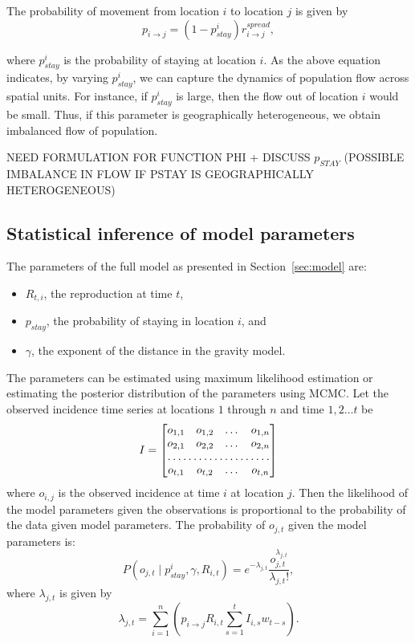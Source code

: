 \documentclass[11pt,]{article}
\begin{document}
The probability of movement from location \(i\) to location \(j\) is given by
\[  p_{i \rightarrow j} = (1 - p_{stay}^i) r_{i \rightarrow j}^{spread},\]

where \(p_{stay}^i\) is the probability of staying at location
\(i\). As the above equation indicates, by varying $p_{stay}^i$, we
can capture the dynamics of population flow across spatial units. For
instance, if \(p_{stay}^i\) is large, then the flow out of location
\(i\) would be small. Thus, if this parameter is geographically
heterogeneous, we obtain imbalanced flow of population. 

NEED FORMULATION FOR FUNCTION PHI + DISCUSS $p_{STAY}$ (POSSIBLE IMBALANCE IN FLOW IF PSTAY IS GEOGRAPHICALLY HETEROGENEOUS)

\subsection{Statistical inference of model parameters}

The parameters of the full model as presented in Section~\ref{sec:model} are: 
\begin{itemize}
\item $R_{t, i}$, the reproduction at time $t$,
\item $p_{stay}$, the probability of staying in location $i$, and 
\item $\gamma$, the exponent of the distance in the gravity model. 
\end{itemize}


The parameters can be estimated using maximum likelihood
estimation or estimating the posterior distribution of the parameters using
MCMC. Let the observed incidence time series at locations \(1\)
through \(n\) and time \(1, 2 \dots t\) be
\[
I = \begin{bmatrix}
    o_{1,1}       & o_{1,2}  & \dots & o_{1,n} \\
    o_{2,1}       & o_{2,2}  & \dots & o_{2,n} \\
    \hdotsfor{4} \\
    o_{t,1}       & o_{t,2}  & \dots & o_{t,n}
\end{bmatrix}
\]
where \(o_{i, j}\) is the observed incidence at time \(i\) at location
\(j\).
Then the likelihood of the model parameters given the
observations is proportional to the probability of the data given
model parameters.  The probability of $o_{j, t}$ given
the model parameters is:
\[ P(o_{j, t} \mid p_{stay}^i, \gamma, R_{i, t}) = e^{-\lambda_{j, t}}
  \frac{o_{j, t}^{\lambda_{j, t}}}{\lambda_{j, t} !}, \]
where $\lambda_{j, t}$ is given by
\[
  \lambda_{j, t} = \sum_{i = 1}^n{\left(p_{i \rightarrow j}R_{i, t} \sum_{s
        = 1}^t{I_{i, s}w_{t - s}} \right)}.\]
\end{document}
